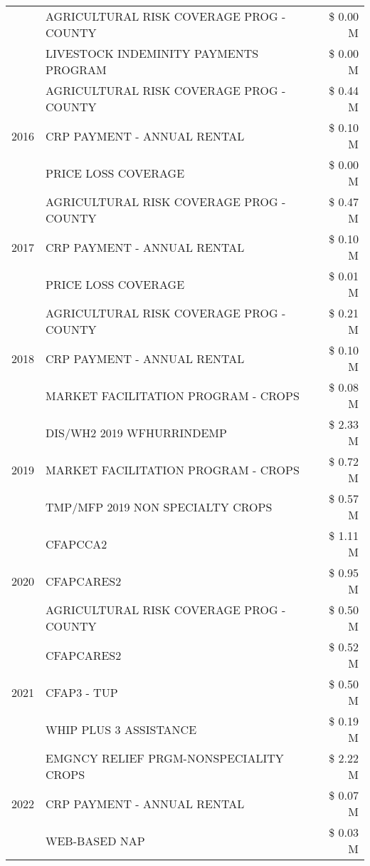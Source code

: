 \begin{tabular}{llr}
 & AGRICULTURAL RISK COVERAGE PROG - COUNTY & \$ 0.00 M \\
 & LIVESTOCK INDEMINITY PAYMENTS PROGRAM & \$ 0.00 M \\
\cline{1-3}
\multirow[t]{3}{*}{2016} & AGRICULTURAL RISK COVERAGE PROG - COUNTY & \$ 0.44 M \\
 & CRP PAYMENT - ANNUAL RENTAL & \$ 0.10 M \\
 & PRICE LOSS COVERAGE & \$ 0.00 M \\
\cline{1-3}
\multirow[t]{3}{*}{2017} & AGRICULTURAL RISK COVERAGE PROG - COUNTY & \$ 0.47 M \\
 & CRP PAYMENT - ANNUAL RENTAL & \$ 0.10 M \\
 & PRICE LOSS COVERAGE & \$ 0.01 M \\
\cline{1-3}
\multirow[t]{3}{*}{2018} & AGRICULTURAL RISK COVERAGE PROG - COUNTY & \$ 0.21 M \\
 & CRP PAYMENT - ANNUAL RENTAL & \$ 0.10 M \\
 & MARKET FACILITATION PROGRAM - CROPS & \$ 0.08 M \\
\cline{1-3}
\multirow[t]{3}{*}{2019} & DIS/WH2 2019 WFHURRINDEMP & \$ 2.33 M \\
 & MARKET FACILITATION PROGRAM - CROPS & \$ 0.72 M \\
 & TMP/MFP 2019 NON SPECIALTY CROPS & \$ 0.57 M \\
\cline{1-3}
\multirow[t]{3}{*}{2020} & CFAPCCA2 & \$ 1.11 M \\
 & CFAPCARES2 & \$ 0.95 M \\
 & AGRICULTURAL RISK COVERAGE PROG - COUNTY & \$ 0.50 M \\
\cline{1-3}
\multirow[t]{3}{*}{2021} & CFAPCARES2 & \$ 0.52 M \\
 & CFAP3 - TUP & \$ 0.50 M \\
 & WHIP PLUS 3 ASSISTANCE & \$ 0.19 M \\
\cline{1-3}
\multirow[t]{3}{*}{2022} & EMGNCY RELIEF PRGM-NONSPECIALITY CROPS & \$ 2.22 M \\
 & CRP PAYMENT - ANNUAL RENTAL & \$ 0.07 M \\
 & WEB-BASED NAP & \$ 0.03 M \\
\cline{1-3}
\bottomrule
\end{tabular}
